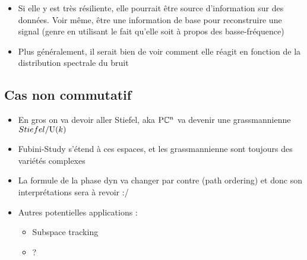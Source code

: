 \begin{itemize}
\begin{itemize}
		\item Si elle y est très résiliente, elle pourrait être source d'information sur des données. Voir même, être une information de base pour reconstruire une signal (genre en utilisant le fait qu'elle soit à propos des basse-fréquence)
		
		\item Plus généralement, il serait bien de voir comment elle réagit en fonction de la distribution spectrale du bruit
	\end{itemize}
	
\end{itemize}



\subsection{\todo Cas non commutatif}\label{subsec:non-commu}

\begin{itemize}
	
	\item En gros on va devoir aller Stiefel, aka $\text{\normalfont P}\mathbb{C}^{n}$ va devenir une grassmannienne $Stiefel/\text{\normalfont U}(k)$
	
	\item Fubini-Study s'étend à ces espaces, et les grassmannienne sont toujours des variétés complexes
	
	\item La formule de la phase dyn va changer par contre (path ordering) et donc son interprétations sera à revoir :/
	
	\item Autres potentielles applications :
	\begin{itemize}
		
		\item Subspace tracking
		
		\item ?
	\end{itemize}
	
\end{itemize}

